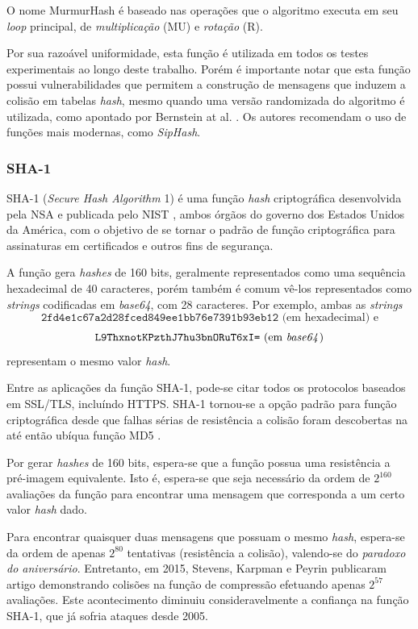 O nome MurmurHash é baseado nas operações que o algoritmo executa em seu \emph{loop} principal, de \emph{multiplicação} (MU) e \emph{rotação} (R). 

Por sua razoável uniformidade, esta função é utilizada em todos os testes experimentais ao longo deste trabalho. Porém é importante notar que esta função possui vulnerabilidades que permitem a construção de mensagens que induzem a colisão em tabelas \emph{hash}, mesmo quando uma versão randomizada do algoritmo é utilizada, como apontado por Bernstein at al. \cite{bernsteinhash}. Os autores recomendam o uso de funções mais modernas, como \emph{SipHash}.

\subsubsection{SHA-1}

SHA-1 (\emph{Secure Hash Algorithm} 1) é uma função \emph{hash} criptográfica desenvolvida pela NSA e publicada pelo NIST \cite{fips2012180}, ambos órgãos do governo dos Estados Unidos da América, com o objetivo de se tornar o padrão de função criptográfica para assinaturas em certificados e outros fins de segurança.

A função gera \emph{hashes} de 160 bits, geralmente representados como uma sequência hexadecimal de 40 caracteres, porém também é comum vê-los representados como \emph{strings} codificadas em \emph{base64}, com 28 caracteres. Por exemplo, ambas as \emph{strings} 
\[
\texttt{2fd4e1c67a2d28fced849ee1bb76e7391b93eb12} \text{ (em hexadecimal) e}
\]
\[
\texttt{L9ThxnotKPzthJ7hu3bnORuT6xI=} \text{ (em \emph{base64})}
\]
representam o mesmo valor \emph{hash}.

Entre as aplicações da função SHA-1, pode-se citar todos os protocolos baseados em SSL/TLS, incluíndo HTTPS. SHA-1 tornou-se a opção padrão para função criptográfica desde que falhas sérias de resistência a colisão foram descobertas na até então ubíqua função MD5 \cite{wang2005break}.

Por gerar \emph{hashes} de 160 bits, espera-se que a função possua uma resistência a pré-imagem equivalente. Isto é, espera-se que seja necessário da ordem de $2^{160}$ avaliações da função para encontrar uma mensagem que corresponda a um certo valor \emph{hash} dado. 

Para encontrar quaisquer duas mensagens que possuam o mesmo \emph{hash}, espera-se da ordem de apenas $2^{80}$ tentativas (resistência a colisão), valendo-se do \emph{paradoxo do aniversário}. Entretanto, em 2015, Stevens, Karpman e Peyrin \cite{cryptoeprint:2015:967} publicaram artigo demonstrando colisões na função de compressão efetuando apenas $2^{57}$ avaliações. Este acontecimento diminuiu consideravelmente a confiança na função SHA-1, que já sofria ataques desde 2005.

